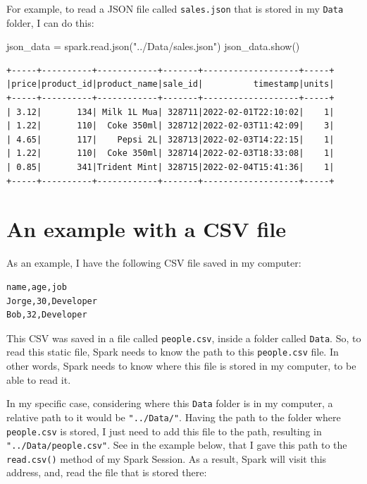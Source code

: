 \documentclass[
  11pt,
  letterpaper,
  DIV=11,
  numbers=noendperiod]{scrreprt}
\newenvironment{Shaded}{\begin{snugshade}}{\end{snugshade}}
\newcommand{\NormalTok}[1]{\textcolor[rgb]{0.00,0.23,0.31}{#1}}
\newcommand{\OperatorTok}[1]{\textcolor[rgb]{0.37,0.37,0.37}{#1}}
\newcommand{\StringTok}[1]{\textcolor[rgb]{0.13,0.47,0.30}{#1}}
\begin{document}
For example, to read a JSON file called \texttt{sales.json} that is
stored in my \texttt{Data} folder, I can do this:

\begin{Shaded}
\begin{Highlighting}[]
\NormalTok{json\_data }\OperatorTok{=}\NormalTok{ spark.read.json(}\StringTok{"../Data/sales.json"}\NormalTok{)}
\NormalTok{json\_data.show()}
\end{Highlighting}
\end{Shaded}

\begin{verbatim}
+-----+----------+------------+-------+-------------------+-----+
|price|product_id|product_name|sale_id|          timestamp|units|
+-----+----------+------------+-------+-------------------+-----+
| 3.12|       134| Milk 1L Mua| 328711|2022-02-01T22:10:02|    1|
| 1.22|       110|  Coke 350ml| 328712|2022-02-03T11:42:09|    3|
| 4.65|       117|    Pepsi 2L| 328713|2022-02-03T14:22:15|    1|
| 1.22|       110|  Coke 350ml| 328714|2022-02-03T18:33:08|    1|
| 0.85|       341|Trident Mint| 328715|2022-02-04T15:41:36|    1|
+-----+----------+------------+-------+-------------------+-----+
\end{verbatim}

\hypertarget{an-example-with-a-csv-file}{%
\section{An example with a CSV file}\label{an-example-with-a-csv-file}}

As an example, I have the following CSV file saved in my computer:

\begin{verbatim}
name,age,job
Jorge,30,Developer
Bob,32,Developer
\end{verbatim}

This CSV was saved in a file called \texttt{people.csv}, inside a folder
called \texttt{Data}. So, to read this static file, Spark needs to know
the path to this \texttt{people.csv} file. In other words, Spark needs
to know where this file is stored in my computer, to be able to read it.

In my specific case, considering where this \texttt{Data} folder is in
my computer, a relative path to it would be \texttt{"../Data/"}. Having
the path to the folder where \texttt{people.csv} is stored, I just need
to add this file to the path, resulting in
\texttt{"../Data/people.csv"}. See in the example below, that I gave
this path to the \texttt{read.csv()} method of my Spark Session. As a
result, Spark will visit this address, and, read the file that is stored
there:
\end{document}
